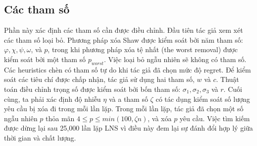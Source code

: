 \subsection{Các tham số}
Phần này xác định các tham số cần được điều chỉnh. Đầu tiên tác giả xem xét các tham số loại bỏ. Phương pháp xóa Shaw được kiểm soát bởi năm tham số: $\varphi, \chi, \psi, \omega$, và $p$, trong khi phương pháp xóa tệ nhất (the worst removal) được kiểm soát bởi một tham số $p_{worst}$. Việc loại bỏ ngẫu nhiên sẽ không có tham số. Các heuristics chèn có tham số tự do khi tác giả đã chọn mức độ regret.
Để kiểm soát các tiêu chí được chấp nhận, tác giả sử dụng hai tham số, $w$ và $c$. Thuật toán điều chỉnh trọng số được kiểm soát bởi bốn tham số: $\sigma_1, \sigma_2, \sigma_3$ và $r$. Cuối cùng, ta phải xác định độ nhiễu $\eta$ và a tham số $\zeta$ có tác dụng kiểm soát số lượng yêu cầu bị xóa đi trong mỗi lần lặp. Trong mỗi lần lặp, tác giả đã chọn một số ngẫu nhiên $p$ thỏa mãn $4 \leq p \leq min(100, \zeta n)$, và xóa $p$ yêu cầu. Việc tìm kiếm được dừng lại sau 25,000 lần lặp LNS vì điều này đem lại sự đánh đổi hợp lý giữa thời gian và chất lượng.


